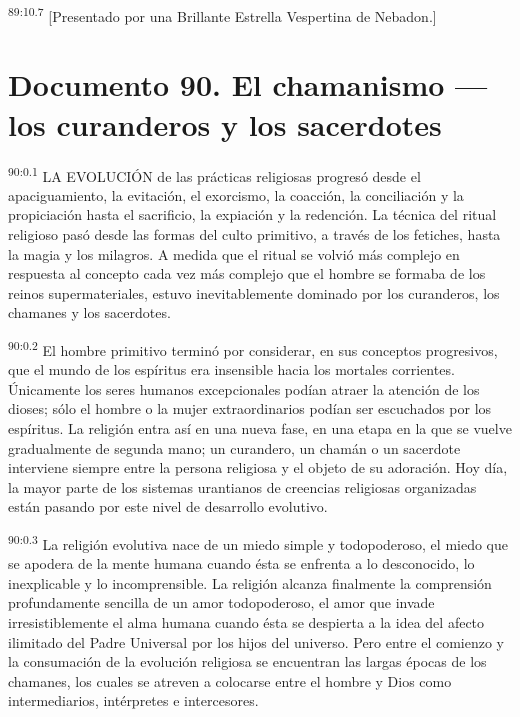 \documentclass[twoside, 11pt]{book}
\begin{document}
\par
\textsuperscript{89:10.7} [Presentado por una Brillante Estrella Vespertina de Nebadon.]


\chapter{Documento 90. El chamanismo ---los curanderos y los sacerdotes}
\par
\textsuperscript{90:0.1} LA EVOLUCIÓN de las prácticas religiosas progresó desde el apaciguamiento, la evitación, el exorcismo, la coacción, la conciliación y la propiciación hasta el sacrificio, la expiación y la redención. La técnica del ritual religioso pasó desde las formas del culto primitivo, a través de los fetiches, hasta la magia y los milagros. A medida que el ritual se volvió más complejo en respuesta al concepto cada vez más complejo que el hombre se formaba de los reinos supermateriales, estuvo inevitablemente dominado por los curanderos, los chamanes y los sacerdotes.

\par
\textsuperscript{90:0.2} El hombre primitivo terminó por considerar, en sus conceptos progresivos, que el mundo de los espíritus era insensible hacia los mortales corrientes. Únicamente los seres humanos excepcionales podían atraer la atención de los dioses; sólo el hombre o la mujer extraordinarios podían ser escuchados por los espíritus. La religión entra así en una nueva fase, en una etapa en la que se vuelve gradualmente de segunda mano; un curandero, un chamán o un sacerdote interviene siempre entre la persona religiosa y el objeto de su adoración. Hoy día, la mayor parte de los sistemas urantianos de creencias religiosas organizadas están pasando por este nivel de desarrollo evolutivo.

\par
\textsuperscript{90:0.3} La religión evolutiva nace de un miedo simple y todopoderoso, el miedo que se apodera de la mente humana cuando ésta se enfrenta a lo desconocido, lo inexplicable y lo incomprensible. La religión alcanza finalmente la comprensión profundamente sencilla de un amor todopoderoso, el amor que invade irresistiblemente el alma humana cuando ésta se despierta a la idea del afecto ilimitado del Padre Universal por los hijos del universo. Pero entre el comienzo y la consumación de la evolución religiosa se encuentran las largas épocas de los chamanes, los cuales se atreven a colocarse entre el hombre y Dios como intermediarios, intérpretes e intercesores.
\end{document}
